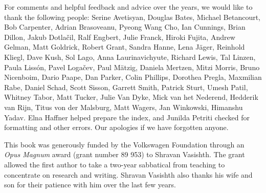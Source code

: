 For comments and helpful feedback and advice over the years, we would like to thank the following people: 
Serine Avetisyan,
Douglas Bates, 
Michael Betancourt, 
Bob Carpenter, 
Adrian Brasoveanu, 
Pyeong Wang Cho,
Ian Cunnings,
Brian Dillon,
Jakub Dotla\v cil,
Ralf Engbert, 
Julie Franck,
Hiroki Fujita, 
Andrew Gelman, 
Matt Goldrick,
Robert Grant,
Sandra Hanne,
Lena J\"ager,
Reinhold Kliegl, 
Dave Kush,
Sol Lago,
Anna Laurinavichyute,
Richard Lewis, 
Tal Linzen, 
Paula Liss\'on,
Pavel Loga{\v c}ev,
Paul M\"atzig,
Daniela Mertzen,
Mitzi Morris, 
Bruno Nicenboim,
Dario Paape,
Dan Parker,
Colin Phillips,
Dorothea Pregla,
Maxmilian Rabe, 
Daniel Schad,
Scott Sisson, 
Garrett Smith,
Patrick Sturt,
Umesh Patil,
Whitney Tabor,
Matt Tucker,
Julie Van Dyke,
Mick van het Nederend,
Hedderik van Rijn,
Titus von der Malsburg,
Matt Wagers,
Jan Winkowski,
Himanshu Yadav. Elna Haffner helped prepare the index, and Junilda Petriti checked for formatting and other errors. 
Our apologies if we have forgotten anyone.


This book was generously funded by the Volkswagen Foundation through an \textit{Opus Magnum} award (grant number 89 953) to Shravan Vasishth. The grant  allowed the first author to take a two-year sabbatical from teaching to concentrate on research and writing. Shravan Vasishth also thanks his wife and son for their patience  with him over the last few years.
